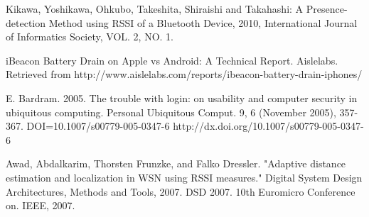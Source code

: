 
%
%
%
\begin{thebibliography}{1}

 Kikawa, Yoshikawa, Ohkubo, Takeshita, Shiraishi and Takahashi:  
 A Presence-detection Method using RSSI of a Bluetooth Device, 2010, International Journal of Informatics Society, VOL. 2, NO. 1. 


iBeacon Battery Drain on Apple vs Android: A Technical Report. Aislelabs. Retrieved from http://www.aislelabs.com/reports/ibeacon-battery-drain-iphones/

E. Bardram. 2005. The trouble with login: on usability and computer security in ubiquitous computing. Personal Ubiquitous Comput. 9, 6 (November 2005), 357-367. DOI=10.1007/s00779-005-0347-6 http://dx.doi.org/10.1007/s00779-005-0347-6

Awad, Abdalkarim, Thorsten Frunzke, and Falko Dressler. "Adaptive distance estimation and localization in WSN using RSSI measures." Digital System Design Architectures, Methods and Tools, 2007. DSD 2007. 10th Euromicro Conference on. IEEE, 2007.

\end{thebibliography}
